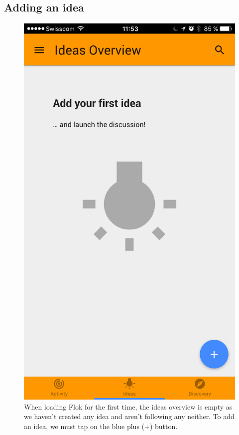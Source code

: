 \documentclass[a4paper,12pt,twoside]{article}
\begin{document}
\subsection{Adding an idea}
\label{sec.addingIdea}

\begin{figure}[!htb]
    \begin{minipage}[t]{.32\textwidth}
        \centering
        \includegraphics[width=\textwidth]{images/flow_addIdea_1.png}
        \caption{When loading Flok for the first time, the ideas overview is empty as we haven't created any idea and aren't following any neither. To add an idea, we must tap on the blue plus (+) button.}

\end{minipage}
\end{figure}
\end{document}
